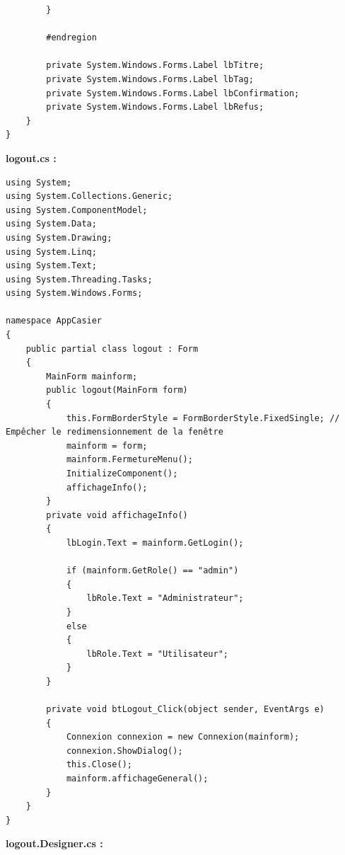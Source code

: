 \documentclass[main.tex]{subfiles}
\begin{document}
\begin{lstlisting}
        }

        #endregion

        private System.Windows.Forms.Label lbTitre;
        private System.Windows.Forms.Label lbTag;
        private System.Windows.Forms.Label lbConfirmation;
        private System.Windows.Forms.Label lbRefus;
    }
}
\end{lstlisting}


\textbf{logout.cs :}

\begin{lstlisting}
using System;
using System.Collections.Generic;
using System.ComponentModel;
using System.Data;
using System.Drawing;
using System.Linq;
using System.Text;
using System.Threading.Tasks;
using System.Windows.Forms;

namespace AppCasier
{
    public partial class logout : Form
    {
        MainForm mainform;
        public logout(MainForm form)
        {
            this.FormBorderStyle = FormBorderStyle.FixedSingle; // Empêcher le redimensionnement de la fenêtre
            mainform = form;
            mainform.FermetureMenu();
            InitializeComponent();
            affichageInfo();
        }
        private void affichageInfo()
        {
            lbLogin.Text = mainform.GetLogin();

            if (mainform.GetRole() == "admin")
            {
                lbRole.Text = "Administrateur";
            }
            else
            {
                lbRole.Text = "Utilisateur";
            }
        }

        private void btLogout_Click(object sender, EventArgs e)
        {
            Connexion connexion = new Connexion(mainform);
            connexion.ShowDialog();
            this.Close();
            mainform.affichageGeneral();
        }
    }
}
\end{lstlisting}

\textbf{logout.Designer.cs :}
\end{document}
